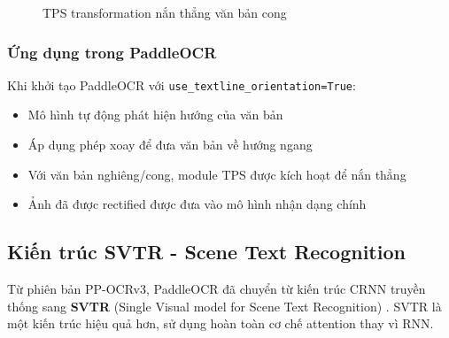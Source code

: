 \begin{figure}[!htbp]
    \centering
    \caption{TPS transformation nắn thẳng văn bản cong}
    \label{fig:tps_transform}
\end{figure}

\subsubsection{Ứng dụng trong PaddleOCR}
Khi khởi tạo PaddleOCR với \texttt{use\_textline\_orientation=True}:
\begin{itemize}
    \item Mô hình tự động phát hiện hướng của văn bản
    \item Áp dụng phép xoay để đưa văn bản về hướng ngang
    \item Với văn bản nghiêng/cong, module TPS được kích hoạt để nắn thẳng
    \item Ảnh đã được rectified được đưa vào mô hình nhận dạng chính
\end{itemize}

\subsection{Kiến trúc SVTR - Scene Text Recognition}

Từ phiên bản PP-OCRv3, PaddleOCR đã chuyển từ kiến trúc CRNN truyền thống sang \textbf{SVTR} (Single Visual model for Scene Text Recognition) \cite{du2022svtr}. SVTR là một kiến trúc hiệu quả hơn, sử dụng hoàn toàn cơ chế attention thay vì RNN.

